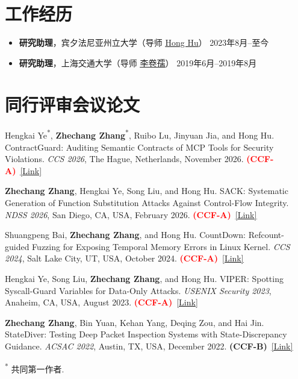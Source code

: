 \documentclass[UTF8,zihao=5,fontset=fandol,letterpaper]{ctexart}
\newcommand{\cvlink}[2]{\href{#1}{\underline{#2}}}
\newcommand{\ccfa}{\mbox{\textcolor{red}{\textbf{(CCF-A)}}}}
\begin{document}
\section{工作经历}

\begin{itemize}
  \item \textbf{研究助理}，宾夕法尼亚州立大学（导师 \cvlink{https://huhong789.github.io/}{Hong Hu}）
    \hfill 2023年8月--至今
  \item \textbf{研究助理}，上海交通大学（导师 \cvlink{https://lijuanru.com/}{李卷孺}）
    \hfill 2019年6月--2019年8月
\end{itemize}

\section{同行评审会议论文}

\begin{enumerate}[label={[\arabic*]},ref=\arabic*]
  \raggedright
  \item\label{pub:contractguard}
    Hengkai Ye\textsuperscript{*}, \textbf{Zhechang Zhang}\textsuperscript{*}, Ruibo Lu, Jinyuan Jia, and Hong Hu.
    ContractGuard: Auditing Semantic Contracts of MCP Tools for Security Violations.
    \textit{CCS 2026}, The Hague, Netherlands, November 2026.
    \ccfa~\cvlink{https://www.sigsac.org/ccs/CCS2026/program/accepted-papers.html}{[Link]}
  \item\label{pub:sack}
    \textbf{Zhechang Zhang}, Hengkai Ye, Song Liu, and Hong Hu.
    SACK: Systematic Generation of Function Substitution Attacks Against Control-Flow Integrity.
    \textit{NDSS 2026}, San Diego, CA, USA, February 2026.
    \ccfa~\cvlink{https://www.ndss-symposium.org/ndss-paper/sack-systematic-generation-of-function-substitution-attacks-against-control-flow-integrity/}{[Link]}
  \item\label{pub:countdown}
    Shuangpeng Bai, \textbf{Zhechang Zhang}, and Hong Hu.
    CountDown: Refcount-guided Fuzzing for Exposing Temporal Memory Errors in Linux Kernel.
    \textit{CCS 2024}, Salt Lake City, UT, USA, October 2024.
    \ccfa~\cvlink{https://dl.acm.org/doi/10.1145/3658644.3690320}{[Link]}
  \item\label{pub:viper}
    Hengkai Ye, Song Liu, \textbf{Zhechang Zhang}, and Hong Hu.
    VIPER: Spotting Syscall-Guard Variables for Data-Only Attacks.
    \textit{USENIX Security 2023}, Anaheim, CA, USA, August 2023.
    \ccfa~\cvlink{https://www.usenix.org/system/files/usenixsecurity23-ye.pdf}{[Link]}
  \item\label{pub:statediver}
    \textbf{Zhechang Zhang}, Bin Yuan, Kehan Yang, Deqing Zou, and Hai Jin.
    StateDiver: Testing Deep Packet Inspection Systems with State-Discrepancy Guidance.
    \textit{ACSAC 2022}, Austin, TX, USA, December 2022.
    \mbox{\textbf{(CCF-B)}}~\cvlink{https://doi.org/10.1145/3564625.3564650}{[Link]}
\end{enumerate}
\textsuperscript{*} 共同第一作者.
\end{document}
